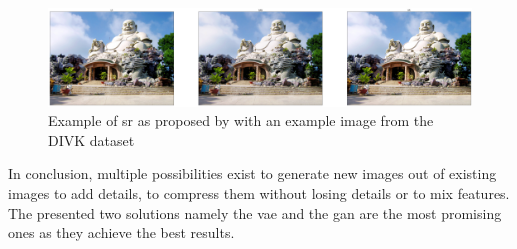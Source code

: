 \begin{figure}[t]
    \includegraphics[width=\textwidth,height=\textheight,keepaspectratio]{logos/SR.png}
     \caption{Example of \gls{sr} as proposed by \cite{Ledig2017} with an example image from the DIVK dataset \parencite{Agustsson2017} }
    \label{fig:srexample}
\end{figure}

\par	
In conclusion, multiple possibilities exist to generate new images out of existing images to add details, to compress them without losing details or to mix features. The presented two solutions namely the \gls{vae} and the \gls{gan} are the most promising ones as they achieve the best results. 

